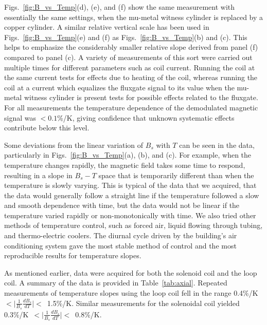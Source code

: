 Figs.~\ref{fig:B_vs_Temp}(d), (e), and (f) show the same measurement
with essentially the same settings, when the mu-metal witness cylinder
is replaced by a copper cylinder.  A similar relative vertical scale
has been used in Figs.~\ref{fig:B_vs_Temp}(e) and (f) as
Figs.~\ref{fig:B_vs_Temp}(b) and (c).  This helps to emphasize the
considerably smaller relative slope derived from panel (f) compared to
panel (c).  A variety of measurements of this sort were carried out
multiple times for different parameters such as coil current.  Running
the coil at the same current tests for effects due to heating of the
coil, whereas running the coil at a current which equalizes the
fluxgate signal to its value when the mu-metal witness cylinder is
present tests for possible effects related to the fluxgate.  For all
measurements the temperature dependence of the demodulated magnetic
signal was $<0.1$\%/K, giving confidence that unknown systematic
effects contribute below this level.

Some deviations from the linear variation of $B_s$ with $T$ can be
seen in the data, particularly in Figs.~\ref{fig:B_vs_Temp}(a), (b),
and (c).  For example, when the temperature changes rapidly, the
magnetic field takes some time to respond, resulting in a slope in
$B_s-T$ space that is temporarily different than when the temperature
is slowly varying.  This is typical of the data that we acquired, that
the data would generally follow a straight line if the temperature
followed a slow and smooth dependence with time, but the data would
not be linear if the temperature varied rapidly or non-monotonically
with time.  We also tried other methods of temperature control, such
as forced air, liquid flowing through tubing, and thermo-electric
coolers.  The diurnal cycle driven by the building's air conditioning
system gave the most stable method of control and the most
reproducible results for temperature slopes.

As mentioned earlier, data were acquired for both the solenoid coil
and the loop coil. A summary of the data is provided in
Table~\ref{tab:axial}.  Repeated measurements of temperature slopes
using the loop coil fell in the range
0.4\%/K~$<\vert\frac{1}{B_s}\frac{dB_s}{dT}\vert<$~1.5\%/K.  Similar
measurements for the solenoidal coil yielded
0.3\%/K~$<\vert\frac{1}{B_s}\frac{dB_s}{dT}\vert<$~0.8\%/K.

